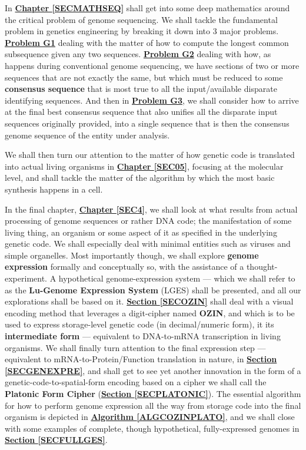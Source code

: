 \documentclass[a4paper, 18pt]{book} %
\begin{document}
In \textbf{\hyperref[SECMATHSEQ]{Chapter \ref{SECMATHSEQ}}} shall get into some deep mathematics around the critical problem of genome sequencing. We shall tackle the fundamental problem in genetics engineering by breaking it down into 3 major problems. \textbf{\hyperref[PROBG1]{Problem G1}} dealing with the matter of how to compute the longest common subsequence given any two sequences. \textbf{\hyperref[PROBG2]{Problem G2}} dealing with how, as happens during conventional genome sequencing, we have sections of two or more sequences that are not exactly the same, but which must be reduced to some \textbf{consensus sequence} that is most true to all the input/available disparate identifying sequences. And then in \textbf{\hyperref[SECCOMPGENSEQ]{Problem G3}}, we shall consider how to arrive at the final best consensus sequence that also unifies all the disparate input sequences originally provided, into a single sequence that is then the consensus genome sequence of the entity under analysis.


We shall then turn our attention to the matter of how genetic code is translated into actual living organisms in \textbf{\hyperref[SEC05]{Chapter \ref{SEC05}}}, focusing at the molecular level, and shall tackle the matter of the algorithm by which the most basic synthesis happens in a cell.


In the final chapter, \textbf{\hyperref[SEC4]{Chapter \ref{SEC4}}}, we shall look at what results from actual processing of genome sequences or rather DNA code; the manifestation of some living thing, an organism or some aspect of it as specified in the underlying genetic code. We shall especially deal with minimal entities such as viruses and simple organelles. Most importantly though, we shall explore \textbf{genome expression} formally and conceptually so, with the assistance of a thought-experiment. A hypothetical genome-expression system --- which we shall refer to as the \textbf{Lu-Genome Expression System} (LGES) shall be presented, and all our explorations shall be based on it. \textbf{\hyperref[SECOZIN]{Section \ref{SECOZIN}}} shall deal with a visual encoding method that leverages a digit-cipher named \textbf{OZIN}, and which is to be used to express storage-level genetic code (in decimal/numeric form), it its \textbf{intermediate form} --- equivalent to DNA-to-mRNA transcription in living organisms. We shall finally turn attention to the final expression step --- equivalent to mRNA-to-Protein/Function translation in nature, in \textbf{\hyperref[SECGENEXPRE]{Section \ref{SECGENEXPRE}}}, and shall get to see yet another innovation in the form of a genetic-code-to-spatial-form encoding based on a cipher we shall call the \textbf{Platonic Form Cipher} (\textbf{\hyperref[SECPLATONIC]{Section \ref{SECPLATONIC}}}). The essential algorithm for how to perform genome expression all the way from storage code into the final organism is depicted in \textbf{\hyperref[ALGCOZINPLATO]{Algorithm \ref{ALGCOZINPLATO}}}, and we shall close with some examples of complete, though hypothetical, fully-expressed genomes in \textbf{\hyperref[SECFULLGES]{Section \ref{SECFULLGES}}}.
\end{document}
